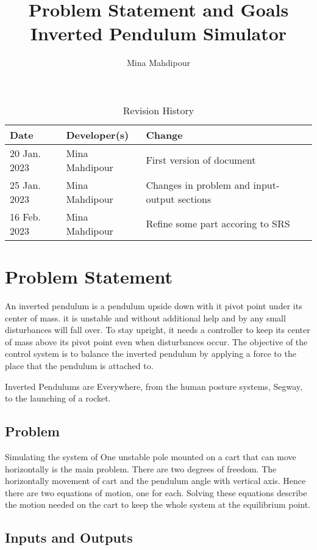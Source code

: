 \documentclass{article}
\title{Problem Statement and Goals\\Inverted Pendulum Simulator}
\author{Mina Mahdipour}
\date{}
\begin{document}
\maketitle

\begin{table}[hp]
\caption{Revision History} \label{TblRevisionHistory}
\begin{tabularx}{\textwidth}{llX}
\toprule
\textbf{Date} & \textbf{Developer(s)} & \textbf{Change}\\
\midrule
20 Jan. 2023 & Mina Mahdipour & First version of document\\
25 Jan. 2023 & Mina Mahdipour & Changes in problem and input-output sections\\
16 Feb. 2023 & Mina Mahdipour & Refine some part accoring to SRS\\
\bottomrule
\end{tabularx}
\end{table}

\section{Problem Statement}

An inverted pendulum is a pendulum upside down with it pivot point under its center of mass. it is unstable and without additional help and by any small disturbances will fall over. To stay upright, it needs a controller to keep its center of mass above its pivot point even when disturbances occur. The objective of the control system is to balance the inverted pendulum by applying a force to the place that the pendulum is attached to.

Inverted Pendulums are Everywhere, from  the human posture systems, Segway, to the launching of a rocket.

\subsection{Problem}

Simulating the system of One unstable pole mounted on a cart that can move horizontally is the main problem. There are two degrees of freedom. The horizontally movement of cart and the pendulum angle with vertical axis. Hence there are two equations of motion, one for each. Solving these equations describe the motion needed on the cart to keep the whole system at the equilibrium point.

\subsection{Inputs and Outputs}
\end{document}
